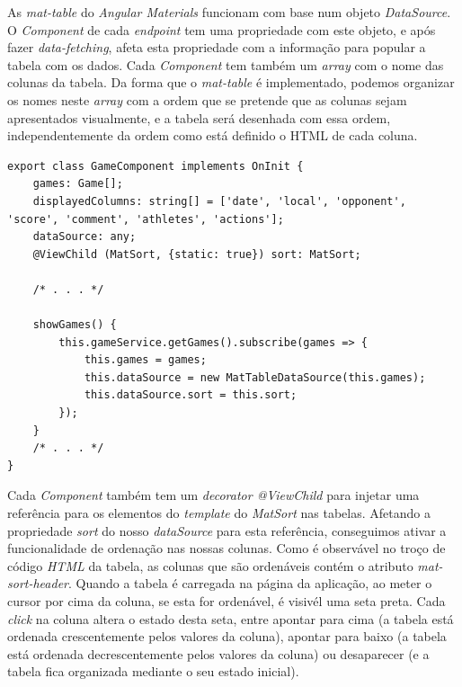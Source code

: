 \newpage
As \textit{mat-table} do \textit{Angular Materials} funcionam com base num objeto \textit{DataSource}. O \textit{Component} de cada \textit{endpoint} tem uma propriedade com este objeto, e após fazer \textit{data-fetching}, afeta esta propriedade com a informação para popular a tabela com os dados. Cada \textit{Component} tem também um \textit{array} com o nome das colunas da tabela. Da forma que o \textit{mat-table} é implementado, podemos organizar os nomes neste \textit{array} com a ordem que se pretende que as colunas sejam apresentados visualmente, e a tabela será desenhada com essa ordem, independentemente da ordem como está definido o HTML de cada coluna. \\



\begin{lstlisting}
export class GameComponent implements OnInit {
	games: Game[];
	displayedColumns: string[] = ['date', 'local', 'opponent', 'score', 'comment', 'athletes', 'actions'];
	dataSource: any;
	@ViewChild (MatSort, {static: true}) sort: MatSort;

	/* . . . */

	showGames() {
		this.gameService.getGames().subscribe(games => {
			this.games = games;
			this.dataSource = new MatTableDataSource(this.games);
			this.dataSource.sort = this.sort;
		});
	}
	/* . . . */
}
\end{lstlisting}

Cada \textit{Component} também tem um \textit{decorator @ViewChild} para injetar uma referência para os elementos do \textit{template} do \textit{MatSort} nas tabelas. Afetando a propriedade \textit{sort} do nosso \textit{dataSource} para esta referência, conseguimos ativar a funcionalidade de ordenação nas nossas colunas. Como é observável no troço de código \textit{HTML} da tabela, as colunas que são ordenáveis contém o atributo \textit{mat-sort-header}. Quando a tabela é carregada na página da aplicação, ao meter o cursor por cima da coluna, se esta for ordenável, é visivél uma seta preta. Cada \textit{click} na coluna altera o estado desta seta, entre apontar para cima (a tabela está ordenada crescentemente pelos valores da coluna), apontar para baixo (a tabela está ordenada decrescentemente pelos valores da coluna) ou desaparecer (e a tabela fica organizada mediante o seu estado inicial). 
\newpage

